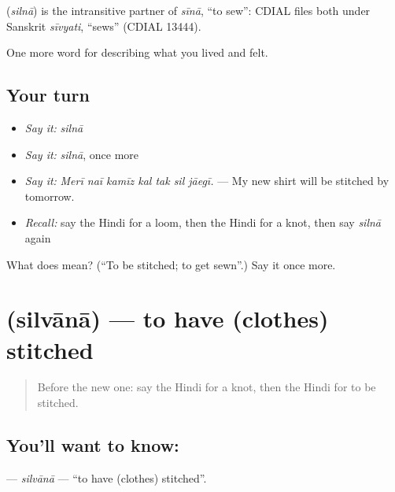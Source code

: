 \begin{cousinweb}
\textbf{} (\emph{silnā}) is the intransitive partner of \emph{sīnā}, \textquotedblleft{}to sew\textquotedblright{}: CDIAL files both under Sanskrit \emph{sīvyati}, \textquotedblleft{}sews\textquotedblright{} (CDIAL 13444).
\end{cousinweb}

\begin{grammarlens}[title={What you've built}]
One more word for describing what you lived and felt.
\end{grammarlens}

\subsection*{Your turn}
\begin{itemize}
\raggedright
  \item \emph{Say it:} \emph{silnā}
  \item \emph{Say it:} \emph{silnā}, once more
  \item \emph{Say it:} \emph{Merī naī kamīz kal tak sil jāegī.} — My new shirt will be stitched by tomorrow.
  \item \emph{Recall:} say the Hindi for a loom, then the Hindi for a knot, then say \emph{silnā} again
\end{itemize}

\begin{tcolorbox}[breakable,colback=teal!4,colframe=teal!35!black,title={Before you move on}]
What does  mean? (\textquotedblleft{}To be stitched; to get sewn\textquotedblright{}.) Say it once more.
\end{tcolorbox}
\section[\texorpdfstring{\hi{सिलवाना} (silvānā)}{सिलवाना (silvānā)}]{ (silvānā) — to have (clothes) stitched}

\label{lesson:HI-C513-silvana}



\begin{quote}
Before the new one: say the Hindi for a knot, then the Hindi for to be stitched.
\end{quote}

\subsection*{You'll want to know: }
\textbf{} — \emph{silvānā} — \textquotedblleft{}to have (clothes) stitched\textquotedblright{}.

